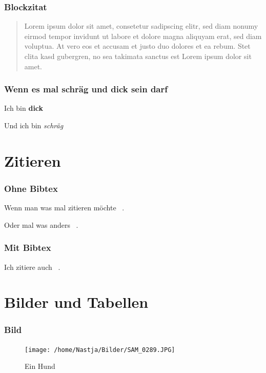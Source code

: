 \begin{frame}

\frametitle{Blockzitat}
\label{blockzitat}

\begin{quote}

Lorem ipsum dolor sit amet, consetetur sadipscing elitr, sed diam nonumy eirmod tempor invidunt ut labore et dolore magna aliquyam erat, sed diam voluptua. At vero eos et accusam et justo duo dolores et ea rebum. Stet clita kasd gubergren, no sea takimata sanctus est Lorem ipsum dolor sit amet. 
\end{quote}

\end{frame}

\begin{frame}

\frametitle{Wenn es mal schräg und dick sein darf}
\label{wennesmalschrgunddickseindarf}

Ich bin \textbf{dick}

Und ich bin \emph{schräg}

\end{frame}

\section{Zitieren}
\label{zitieren}

\begin{frame}

\frametitle{Ohne Bibtex}
\label{ohnebibtex}

Wenn man was mal zitieren möchte ~\citep{Doe}.

Oder mal was anders ~\citep{Johnson}.

\end{frame}

\begin{frame}

\frametitle{Mit Bibtex}
\label{mitbibtex}

Ich zitiere auch ~\citep{Wickens}. 

\end{frame}

\section{Bilder und Tabellen}
\label{bilderundtabellen}

\begin{frame}

\frametitle{Bild}
\label{bild}

\begin{figure}[htbp]
\centering
\texttt{[image: /home/Nastja/Bilder/SAM\_0289.JPG]}
\caption{Ein Hund}
\label{}
\end{figure}


\end{frame}

